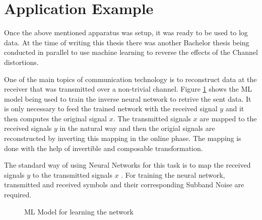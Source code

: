 \section{Application Example}\label{sec:AppEx}

Once the above mentioned apparatus was setup, it was ready to be used to log data. At the time of writing this thesis there was another Bachelor thesis being conducted in parallel to use machine learning to reverse the effects of the Channel distortions.

One of the main topics of communication technology is to reconstruct data at the
receiver that was transmitted over a non-trivial channel. Figure \ref{fig:MLModel} shows the ML model being used to train the inverse neural network to retrive the sent data. It is only necessary to feed the trained network with the received signal $y$ and it then computes the original signal $x$. The transmitted signals $x$ are mapped to the received signals $y$ in the natural way and then the origial signals are reconstructed by inverting this mapping in the online phase. The mapping is done with the help of invertible and composable transformation.

The standard way of using Neural Networks for this task is to map the received signals $y$ to the transmitted signals $x$ \cite{JMMLINN}. For training the neural network, transmitted and received symbols and their corresponding Subband Noise are required.

\begin{center}
    \begin{figure}[H]
    \caption{ML Model for learning the network}
    \label{fig:MLModel}
    \end{figure}
\end{center}

